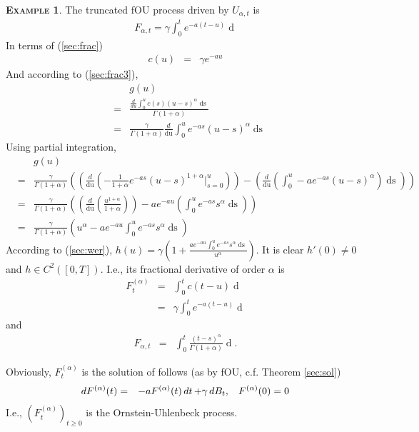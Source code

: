 \documentclass[a4paper, twoside, 11pt]{article}
\theoremstyle{definition}
\newtheorem{example}[definition]{\scshape Example}
\newcommand{\brkt}[1]{\left({#1} \right)}
\begin{document}
  \begin{example}
  The truncated fOU process driven by $U_{\alpha, t}$ is 
  \begin{eqnarray}
  F_{\alpha,t} = \gamma\int_0^t e^{-a(t-u)}\mathop{dU_{\alpha, u}} 
  \label{sec:cc2}
\end{eqnarray}
In terms of (\ref{sec:frac})
\begin{eqnarray*}
  c(u) &=&  \gamma e^{-au}
\end{eqnarray*}
And according to  (\ref{sec:frac3}),
\begin{eqnarray*}
  &&g(u)\\
  &=& \frac{\frac{d}{du}\int_0^{u} c(s)(u-s)^\alpha \mathop{ds}}{\Gamma(1+\alpha)}\\
  &=& \frac{\gamma}{\Gamma(1+\alpha)}\frac{d}{\mathop{du}}\int_0^u e^{-as} (u-s)^\alpha \mathop{ds}
\end{eqnarray*}
Using partial integration,
\begin{eqnarray*}
  &&g(u)\\
  &=& \frac{\gamma}{\Gamma(1+\alpha)}\brkt{\brkt{\frac{d}{\mathop{du}} (-\frac{1}{1+\alpha}e^{-as}(u-s)^{1+\alpha}|_{s=0}^u)} - \brkt{\frac{d}{\mathop{du}}(\int_0^u -a e^{-as}(u-s)^\alpha)\mathop{ds}}}\\
  &=& \frac{\gamma}{\Gamma(1+\alpha)}\brkt{\brkt{\frac{d}{\mathop{du}}(\frac{u^{1+\alpha}}{1+\alpha})} - a e^{-au}\brkt{\int_0^u e^{-as}s^\alpha\mathop{ds}}}\\
  &=& \frac{\gamma}{\Gamma(1+\alpha)} (u^\alpha - a e^{-au}\int_0^u e^{-as}s^\alpha\mathop{ds})
\end{eqnarray*}
According to (\ref{sec:wer}), $h(u) = \gamma (1 + \frac{a e^{-au}\int_0^u e^{-as}s^\alpha\mathop{ds}}{u^\alpha})$. It is clear $h'(0)\neq 0$ and $h\in C^2([0,T])$. I.e., its fractional derivative of order $\alpha$ is 
\begin{eqnarray}
  F^{(\alpha)}_t &=&  \int_0^t c(t-u) \mathop{dB_u}\nonumber\\
  &=& \gamma\int_0^t e^{-a(t-u)}\mathop{dB_u}
  \label{sec:wie}
\end{eqnarray}
and 
\begin{eqnarray}
  F_{\alpha,t} &=& \int_0^t \frac{(t-s)^\alpha}{\Gamma(1+\alpha)} \mathop{dF^{(\alpha)}(s)}.
  \label{sec:was}
\end{eqnarray}

Obviously, $F^{(\alpha)}_t$ is the solution of follows (as by fOU, c.f. Theorem \ref{sec:sol})
\begin{eqnarray*}
  dF^{(\alpha)}(t) &=& -a F^{(\alpha)}(t)\mathop{dt} + \gamma \mathop{dB_t},\hspace{3mm}F^{(\alpha)}(0)=0
\end{eqnarray*}
I.e., $(F^{(\alpha)}_t)_{t\ge 0}$ is the Ornstein-Uhlenbeck process.
\end{example}
\end{document}

